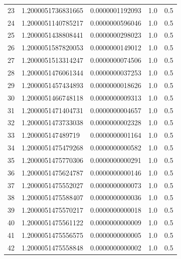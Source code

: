 \documentclass[titlepage,a4paper]{article}
\begin{document}
\begin{center}
\begin{tabular}{| c | l | c | c | c |}
23      & 1.2000051736831665  &  0.0000001192093  &  1.0  &  0.5 \\
24      & 1.2000051140785217  &  0.0000000596046  &  1.0  &  0.5 \\
25      & 1.2000051438808441  &  0.0000000298023  &  1.0  &  0.5 \\
26      & 1.2000051587820053  &  0.0000000149012  &  1.0  &  0.5 \\
27      & 1.2000051513314247  &  0.0000000074506  &  1.0  &  0.5 \\
28      & 1.2000051476061344  &  0.0000000037253  &  1.0  &  0.5 \\
29      & 1.2000051457434893  &  0.0000000018626  &  1.0  &  0.5 \\
30      & 1.2000051466748118  &  0.0000000009313  &  1.0  &  0.5 \\
31      & 1.2000051471404731  &  0.0000000004657  &  1.0  &  0.5 \\
32      & 1.2000051473733038  &  0.0000000002328  &  1.0  &  0.5 \\
33      & 1.200005147489719  &  0.0000000001164  &  1.0  &  0.5 \\
34      & 1.2000051475479268  &  0.0000000000582  &  1.0  &  0.5 \\
35      & 1.2000051475770306  &  0.0000000000291  &  1.0  &  0.5 \\
36      & 1.2000051475624787  &  0.0000000000146  &  1.0  &  0.5 \\
37      & 1.2000051475552027  &  0.0000000000073  &  1.0  &  0.5 \\
38      & 1.2000051475588407  &  0.0000000000036  &  1.0  &  0.5 \\
39      & 1.2000051475570217  &  0.0000000000018  &  1.0  &  0.5 \\
40      & 1.2000051475561122  &  0.0000000000009  &  1.0  &  0.5 \\
41      & 1.2000051475556575  &  0.0000000000005  &  1.0  &  0.5 \\
42      & 1.2000051475558848  &  0.0000000000002  &  1.0  &  0.5 \\


           \hline
    \end{tabular}
\end{center}
\end{document}
